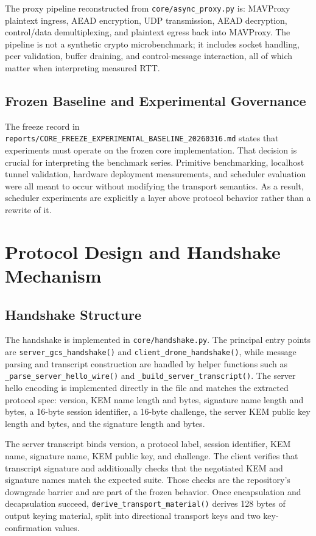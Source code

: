 \documentclass[conference]{IEEEtran}
\begin{document}
The proxy pipeline reconstructed from \texttt{core/async\_proxy.py} is: MAVProxy plaintext ingress, AEAD encryption, UDP transmission, AEAD decryption, control/data demultiplexing, and plaintext egress back into MAVProxy. The pipeline is not a synthetic crypto microbenchmark; it includes socket handling, peer validation, buffer draining, and control-message interaction, all of which matter when interpreting measured RTT.

\subsection{Frozen Baseline and Experimental Governance}
The freeze record in \texttt{reports/CORE\_FREEZE\_EXPERIMENTAL\_BASELINE\_20260316.md} states that experiments must operate on the frozen core implementation. That decision is crucial for interpreting the benchmark series. Primitive benchmarking, localhost tunnel validation, hardware deployment measurements, and scheduler evaluation were all meant to occur without modifying the transport semantics. As a result, scheduler experiments are explicitly a layer above protocol behavior rather than a rewrite of it.

\section{Protocol Design and Handshake Mechanism}
\subsection{Handshake Structure}
The handshake is implemented in \texttt{core/handshake.py}. The principal entry points are \texttt{server\_gcs\_handshake()} and \texttt{client\_drone\_handshake()}, while message parsing and transcript construction are handled by helper functions such as \texttt{\_parse\_server\_hello\_wire()} and \texttt{\_build\_server\_transcript()}. The server hello encoding is implemented directly in the file and matches the extracted protocol spec: version, KEM name length and bytes, signature name length and bytes, a 16-byte session identifier, a 16-byte challenge, the server KEM public key length and bytes, and the signature length and bytes.

The server transcript binds version, a protocol label, session identifier, KEM name, signature name, KEM public key, and challenge. The client verifies that transcript signature and additionally checks that the negotiated KEM and signature names match the expected suite. Those checks are the repository's downgrade barrier and are part of the frozen behavior. Once encapsulation and decapsulation succeed, \texttt{derive\_transport\_material()} derives 128 bytes of output keying material, split into directional transport keys and two key-confirmation values.
\end{document}
